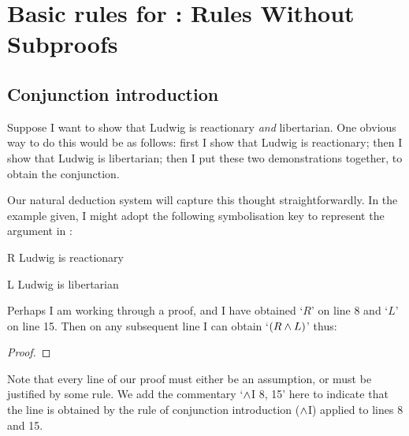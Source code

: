 \chapter{Basic rules for \textnormal{\TFL}: Rules Without Subproofs}\label{s:BasicTFLns}


\section{Conjunction introduction}\label{conjint}
Suppose I want to show that Ludwig is reactionary \emph{and} libertarian. One obvious way to do this would be as follows: first I show that Ludwig is reactionary; then I show that Ludwig is libertarian; then I put these two demonstrations together, to obtain the conjunction.

Our natural deduction system will capture this thought straightforwardly. In the example given, I might adopt the following symbolisation key to represent the argument in \TFL:
	\begin{ekey}
		\item[R] Ludwig is reactionary
		\item[L] Ludwig is libertarian
	\end{ekey}
Perhaps I am working through a proof, and I have obtained `$R$' on line 8 and `$L$' on line 15. Then on any subsequent line I can obtain `$(R \wedge L)$' thus:
\begin{proof}
	 
\end{proof}
Note that every line of our proof must either be an assumption, or must be justified by some rule. We add the commentary `$\wedge$I 8, 15' here to indicate that the line is obtained by the rule of conjunction introduction ($\wedge$I) applied to lines 8 and 15. 

